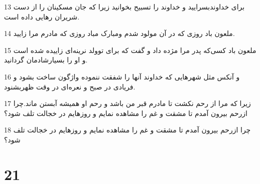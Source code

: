 \par 13 برای خداوندبسرایید و خداوند را تسبیح بخوانید زیرا که جان مسکینان را از دست شریران رهایی داده است.
\par 14 ملعون باد روزی که در آن مولود شدم ومبارک مباد روزی که مادرم مرا زایید.
\par 15 ملعون باد کسی‌که پدر مرا مژده داد و گفت که برای توولد نرینه‌ای زاییده شده است و او را بسیارشادمان گردانید.
\par 16 و آنکس مثل شهرهایی که خداوند آنها را شفقت ننموده واژگون ساخت بشود و فریادی در صبح و نعره‌ای در وقت ظهربشنود.
\par 17 زیرا که مرا از رحم نکشت تا مادرم قبر من باشد و رحم او همیشه آبستن ماند.چرا ازرحم بیرون آمدم تا مشقت و غم را مشاهده نمایم و روزهایم در خجالت تلف شود؟
\par 18 چرا ازرحم بیرون آمدم تا مشقت و غم را مشاهده نمایم و روزهایم در خجالت تلف شود؟
 
\chapter{21}

